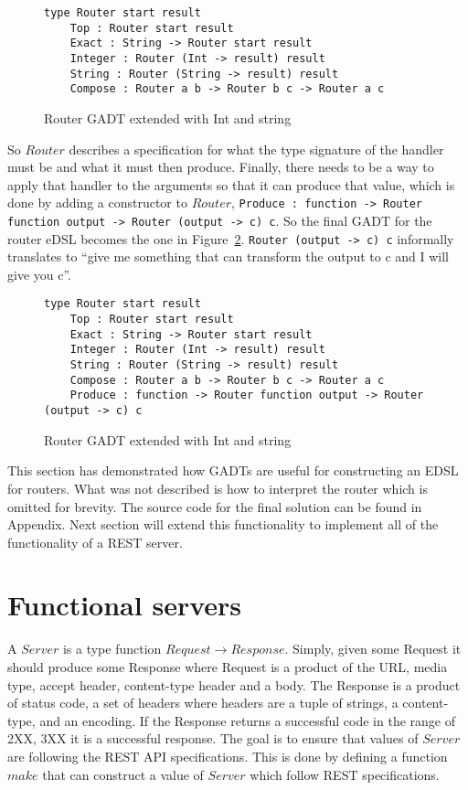 \begin{figure}[H]
    \begin{lstlisting}
type Router start result 
    Top : Router start result
    Exact : String -> Router start result
    Integer : Router (Int -> result) result
    String : Router (String -> result) result
    Compose : Router a b -> Router b c -> Router a c
    \end{lstlisting}
    \caption{Router GADT extended with Int and string}
    \label{extendedrouter}
\end{figure}

So $Router$ describes a specification for what the type signature of the handler
must be and what it must then produce. Finally, there needs to be a way to apply
that handler to the arguments so that it can produce that value, which is done
by adding a constructor to $Router$, \texttt{Produce : function -> Router
function output -> Router (output -> c) c}. So the final GADT for the router
eDSL becomes the one in Figure~\ref{finalrouter}. \texttt{Router (output -> c)
c} informally translates to ``give me something that can transform the output to
c and I will give you c''.

\begin{figure}[H]
    \begin{lstlisting}
type Router start result 
    Top : Router start result
    Exact : String -> Router start result
    Integer : Router (Int -> result) result
    String : Router (String -> result) result
    Compose : Router a b -> Router b c -> Router a c
    Produce : function -> Router function output -> Router (output -> c) c
    \end{lstlisting}
    \caption{Router GADT extended with Int and string}
    \label{finalrouter}
\end{figure}

This section has demonstrated how GADTs are useful for constructing an EDSL for
routers. What was not described is how to interpret the router which is omitted
for brevity. The source code for the final solution can be found in Appendix.
Next section will extend this functionality to implement all of the
functionality of a REST server.

\section{Functional servers}

A $Server$ is a type function $Request \rightarrow Response$. Simply, given some
Request it should produce some Response where Request is a product of the URL,
media type, accept header, content-type header and a body.  The Response is a
product of status code, a set of headers where headers are a tuple of strings, a
content-type, and an encoding. If the Response returns a successful code in the
range of 2XX, 3XX it is a successful response. The goal is to ensure that values
of $Server$ are following the REST API specifications.  This is done by defining
a function $make$ that can construct a value of $Server$ which follow REST
specifications.

